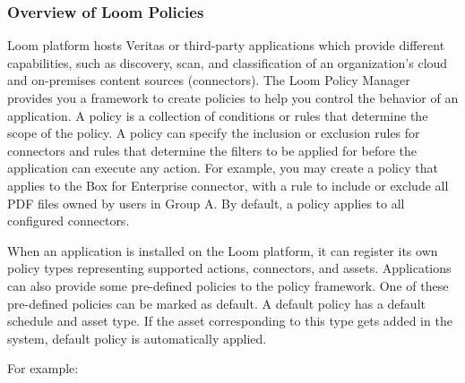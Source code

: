 \documentclass[letterpaper,10pt,english]{sphinxmanual}
\begin{document}
\subsubsection{Overview of Loom Policies}
\label{\detokenize{loom_getting_started_guide:content-loom-policy-mngt}}\label{\detokenize{loom_getting_started_guide:overview-of-loom-policies}}
Loom platform hosts Veritas or third-party applications which provide different capabilities, such as discovery, scan, and classification of an organization’s cloud and on-premises content sources (connectors). The Loom Policy Manager provides you a framework to create policies to help you control the behavior of an application. A policy is a collection of conditions or rules that determine the scope of the policy. A policy can specify the inclusion or exclusion rules for connectors and rules that determine the filters to be applied for before the application can execute any action. For example, you may create a policy that applies to the Box for Enterprise connector, with a rule to include or exclude all PDF files owned by users in Group A. By default, a policy applies to all configured connectors.

When an application is installed on the Loom platform, it can register its own policy types representing supported actions, connectors, and assets. Applications can also provide some pre-defined policies to the policy framework. One of these pre-defined policies can be marked as default. A default policy has a default schedule and asset type. If the asset corresponding to this type gets added in the system, default policy is automatically applied.

For example:
\end{document}
